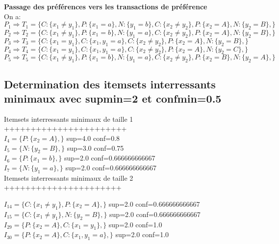 \documentclass[11pt,a4paper]{article}
\theoremstyle{definition}
\begin{document}
       \textbf{Passage des préférences vers les transactions de préférence}\\
       On a:\\
  
       
       \noindent $P_{1}\Rightarrow T_{1}=\{C:\{x_{1}\neq y_{1}\},P:\{x_{1}=a\},N:\{y_{1}=b\},C:\{x_{2}\neq y_{2}\},P:\{x_{2}=A\},N:\{y_{2}=B\},\}$ \\
       
       \noindent $P_{2}\Rightarrow T_{2}=\{C:\{x_{1}\neq y_{1}\},P:\{x_{1}=b\},N:\{y_{1}=a\},C:\{x_{2}\neq y_{2}\},P:\{x_{2}=A\},N:\{y_{2}=B\},\}$ \\
       
       \noindent $P_{3}\Rightarrow T_{3}=\{C:\{x_{1}=y_{1}\},C:\{x_{1},y_{1}=a\},C:\{x_{2}\neq y_{2}\},P:\{x_{2}=A\},N:\{y_{2}=B\},\}$ \\
       
       \noindent $P_{4}\Rightarrow T_{4}=\{C:\{x_{1}=y_{1}\},C:\{x_{1},y_{1}=a\},C:\{x_{2}\neq y_{2}\},P:\{x_{2}=A\},N:\{y_{2}=C\},\}$ \\
       
       \noindent $P_{5}\Rightarrow T_{5}=\{C:\{x_{1}\neq y_{1}\},P:\{x_{1}=b\},N:\{y_{1}=a\},C:\{x_{2}\neq y_{2}\},P:\{x_{2}=B\},N:\{y_{2}=A\},\}$ \\
       
       
       
       \subsection{Determination des itemsets interressants minimaux avec supmin=2 et confmin=0.5}
       
       Itemsets interressants minimaux de taille 1 +++++++++++++++++++++++\\
       
       $I_{4}=\{P:\{x_{2}=A\},\}$  sup=4.0 conf=0.8\\
       $I_{5}=\{N:\{y_{2}=B\},\}$  sup=3.0 conf=0.75\\
       $I_{6}=\{P:\{x_{1}=b\},\}$  sup=2.0 conf=0.666666666667\\
       $I_{7}=\{N:\{y_{1}=a\},\}$  sup=2.0 conf=0.666666666667\\
       
       Itemsets interressants minimaux de taille 2 ++++++++++++++++++++++\
       
       $I_{14}=\{C:\{x_{1}\neq y_{1}\},P:\{x_{2}=A\},\}$  sup=2.0 conf=0.666666666667\\
       $I_{15}=\{C:\{x_{1}\neq y_{1}\},N:\{y_{2}=B\},\}$  sup=2.0 conf=0.666666666667\\
       $I_{29}=\{P:\{x_{2}=A\},C:\{x_{1}=y_{1}\},\}$  sup=2.0 conf=1.0\\
       $I_{30}=\{P:\{x_{2}=A\},C:\{x_{1},y_{1}=a\},\}$  sup=2.0 conf=1.0\\
       
\end{document}
